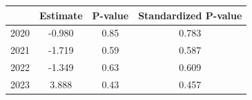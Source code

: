 \begin{tabular}{lccc}
\hline
 & Estimate & P-value & Standardized P-value \\
\hline
2020 & -0.980 & 0.85 & 0.783 \\
2021 & -1.719 & 0.59 & 0.587 \\
2022 & -1.349 & 0.63 & 0.609 \\
2023 & 3.888 & 0.43 & 0.457 \\
\hline
\end{tabular}
